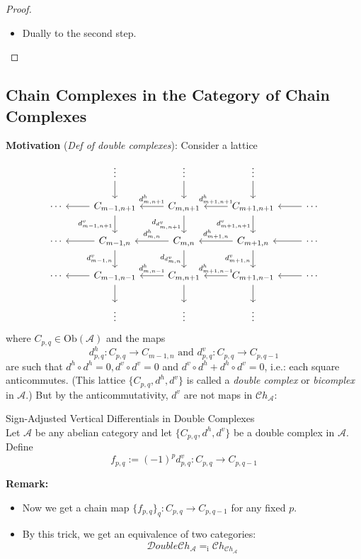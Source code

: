 \begin{proof}
\begin{itemize}
        \item Dually to the second step.
    \end{itemize}
\end{proof}

\subsection{Chain Complexes in the Category of Chain Complexes}

\noindent\textbf{Motivation} (\textit{Def of double complexes}): Consider a lattice
\[
\begin{tikzcd}
    &\vdots \arrow[d] &\vdots \arrow[d] &\vdots \arrow[d]\\
    \cdots & C_{m-1,n+1} \arrow[l] \arrow[d, "d^v_{m-1,n+1}"'] &C_{m,n+1} \arrow[l, "d^h_{m,n+1}"'] \arrow[d, "d_{d^v_{m,n+1}}"']& C_{m+1,n+1} \arrow[l, "d^h_{m+1,n+1}"'] \arrow[d, "d^v_{m+1,n+1}"'] &\cdots \arrow[l]\\
    \cdots & C_{m-1,n} \arrow[l] \arrow[d, "d^v_{m-1,n}"'] &C_{m,n} \arrow[l, "d^h_{m,n}"'] \arrow[d, "d_{d^v_{m,n}}"']& C_{m+1,n} \arrow[l, "d^h_{m+1,n}"'] \arrow[d, "d^v_{m+1,n}"'] &\cdots \arrow[l]\\
    \cdots & C_{m-1,n-1} \arrow[l] \arrow[d] &C_{m,n+1} \arrow[l, "d^h_{m,n-1}"'] \arrow[d]& C_{m+1,n-1} \arrow[l, "d^h_{m+1,n-1}"'] \arrow[d] &\cdots \arrow[l]\\
    &\vdots &\vdots &\vdots
\end{tikzcd}
\]
where $C_{p,q} \in \text{Ob} (\mathcal{A})$ and the maps
\[
d^h_{p,q} :C_{p,q} \to C_{m-1,n} \text{ and } d^v_{p,q}: C_{p,q} \to C_{p,q-1}
\]
are such that $d^h \circ d^h= 0, d^v \circ d^v=0$ and $d^v\circ d^h +d^h \circ d^v=0$, i.e.: each square anticommutes. (This lattice $\{C_{p,q}, d^h,d^v\}$ is called a \textit{double complex} or \textit{bicomplex} in $\mathcal{A}$.) But by the anticommutativity, $d^v$ are not maps in $\mathcal{C}h_\mathcal{A}$:

\begin{definition}{Sign-Adjusted Vertical Differentials in Double Complexes}\\
Let $\mathcal{A}$ be any abelian category and let $\{C_{p,q} ,d^h,d^v\}$ be a double complex in $\mathcal{A}$. Define
\[
f_{p,q} := (-1)^p d_{p,q}^v: C_{p,q} \to C_{p,q-1}
\]
\end{definition}

\noindent\textbf{Remark:} \begin{itemize}
    \item Now we get a chain map $\{f_{p,q}\}_q: C_{p,q} \to C_{p,q-1}$ for any fixed $p$.
    \item By this trick, we get an equivalence of two categories:
    \[
    \mathcal{D}ouble\mathcal{C}h_\mathcal{A} =_\text{i} \mathcal{C}h_{\mathcal   Ch_{\mathcal{A}}}
    \]
\end{itemize}

